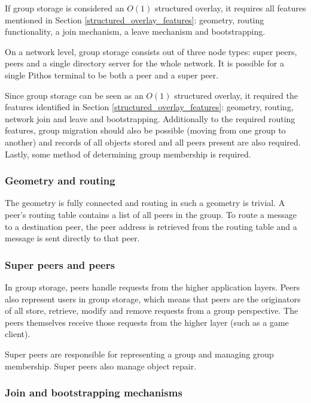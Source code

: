 If group storage is considered an $O(1)$ structured overlay, it requires all features mentioned in Section \ref{structured_overlay_features}: geometry, routing functionality, a join mechanism, a leave mechanism and bootstrapping.

On a network level, group storage consists out of three node types: super peers, peers and a single directory server for the whole network. It is possible for a single Pithos terminal to be both a peer and a super peer.

Since group storage can be seen as an $O(1)$ structured overlay, it required the features identified in Section \ref{structured_overlay_features}: geometry, routing, network join and leave and bootstrapping. Additionally to the required routing features, group migration should also be possible (moving from one group to another) and records of all objects stored and all peers present are also required. Lastly, some method of determining group membership is required.

\subsubsection{Geometry and routing}

The geometry is fully connected and routing in such a geometry is trivial. A peer's routing table contains a list of all peers in the group. To route a message to a destination peer, the peer address is retrieved from the routing table and a message is sent directly to that peer.

\subsubsection{Super peers and peers}

In group storage, peers handle requests from the higher application layers. Peers also represent users in group storage, which means that peers are the originators of all store, retrieve, modify and remove requests from a group perspective. The peers themselves receive those requests from the higher layer (such as a game client).

Super peers are responsible for representing a group and managing group membership. Super peers also manage object repair.

\subsubsection{Join and bootstrapping mechanisms}
\label{join_mechanism_design}

